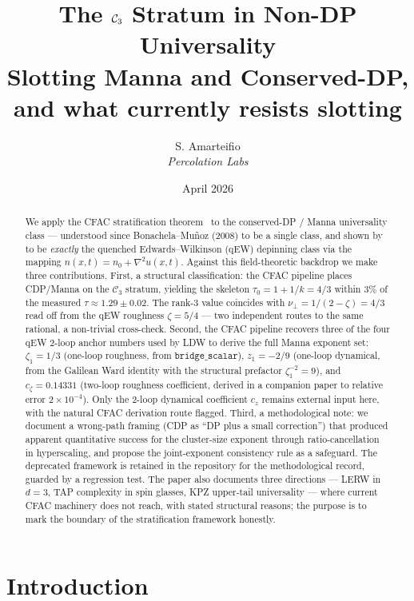 \documentclass[10pt,a4paper,twocolumn]{article}
\title{The $\Cstr{3}$ Stratum in Non-DP Universality\\[2pt]
  \large Slotting Manna and Conserved-DP, and what currently resists slotting}
\author{S. Amarteifio\\
  \small\textit{Percolation Labs}}
\date{April 2026}
\theoremstyle{plain}
\theoremstyle{definition}
\newcommand{\Cstr}[1]{\mathcal{C}_{#1}}
\begin{document}
\maketitle

\begin{abstract}
We apply the CFAC stratification theorem~\citep{AmarteifioCFAC2026}
to the conserved-DP / Manna universality class --- understood since
Bonachela--Mu\~noz (2008) to be a single class, and shown by
\citet{LeDoussalWiese2015} to be \emph{exactly} the quenched
Edwards--Wilkinson (qEW) depinning class via the mapping
$n(x,t) = n_0 + \nabla^2 u(x,t)$.  Against this field-theoretic
backdrop we make three contributions.  First, a structural
classification: the CFAC pipeline places CDP/Manna on the $\Cstr{3}$
stratum, yielding the skeleton $\tau_0 = 1+1/k = 4/3$ within $3\%$
of the measured $\tau \approx 1.29 \pm 0.02$.  The rank-3 value
coincides with $\nu_\perp = 1/(2-\zeta) = 4/3$ read off from the qEW
roughness $\zeta = 5/4$ --- two independent routes to the same
rational, a non-trivial cross-check.  Second, the CFAC pipeline
recovers three of the four qEW 2-loop anchor numbers used by LDW
to derive the full Manna exponent set: $\zeta_1 = 1/3$ (one-loop
roughness, from $\texttt{bridge\_scalar}$), $z_1 = -2/9$ (one-loop
dynamical, from the Galilean Ward identity with the structural
prefactor $\zeta_1^{-2} = 9$), and $c_\zeta = 0.14331$ (two-loop
roughness coefficient, derived in a companion paper
\citep{Amarteifio2026LDWC} to relative error $2\times 10^{-4}$).
Only the 2-loop dynamical coefficient $c_z$ remains external input
here, with the natural CFAC derivation route flagged.  Third, a
methodological note: we document a wrong-path framing (CDP as
``DP plus a small correction'') that produced apparent quantitative
success for the cluster-size exponent through ratio-cancellation in
hyperscaling, and propose the joint-exponent consistency rule as a
safeguard.  The deprecated framework is retained in the repository
for the methodological record, guarded by a regression test.
The paper also documents three directions --- LERW in $d=3$, TAP
complexity in spin glasses, KPZ upper-tail universality --- where
current CFAC machinery does not reach, with stated structural
reasons; the purpose is to mark the boundary of the stratification
framework honestly.
\end{abstract}

\tableofcontents

\section{Introduction}
\label{sec:intro}
\end{document}
